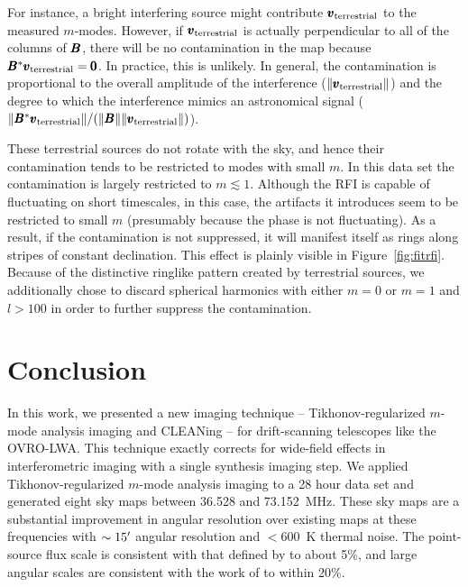\begin{bibunit}
For instance, a bright interfering source might contribute $\pmb v_\text{terrestrial}$ to the measured
$m$-modes. However, if $\pmb v_\text{terrestrial}$ is actually perpendicular to all of the columns of
$\pmb B$, there will be no contamination in the map because $\pmb B^*\pmb v_\text{terrestrial} = \pmb 0$.
In practice, this is unlikely. In general, the contamination is proportional to the overall amplitude
of the interference ($\|\pmb v_\text{terrestrial}\|$) and the degree to which the interference mimics
an astronomical signal ($\|\pmb B^*\pmb v_\text{terrestrial}\|/(\|\pmb B\|\|\pmb v_\text{terrestrial}\|)$).

These terrestrial sources do not rotate with the sky, and hence their contamination tends to be
restricted to modes with small $m$. In this data set the contamination is largely restricted to $m
\lesssim 1$. Although the RFI is capable of fluctuating on short timescales, in this case, the
artifacts it introduces seem to be restricted to small $m$ (presumably because the phase is not
fluctuating).  As a result, if the contamination is not suppressed, it will manifest itself as rings
along stripes of constant declination. This effect is plainly visible in Figure~\ref{fig:fitrfi}.
Because of the distinctive ringlike pattern created by terrestrial sources, we additionally chose to
discard spherical harmonics with either $m=0$ or $m=1$ and $l>100$ in order to further suppress the
contamination.

\section{Conclusion}\label{sec:conclusion}

In this work, we presented a new imaging technique -- Tikhonov-regularized $m$-mode analysis imaging
and CLEANing -- for drift-scanning telescopes like the OVRO-LWA.  This technique exactly corrects
for wide-field effects in interferometric imaging with a single synthesis imaging step.  We applied
Tikhonov-regularized $m$-mode analysis imaging to a 28 hour data set and generated eight sky maps
between 36.528 and 73.152~MHz.  These sky maps are a substantial improvement in angular resolution
over existing maps at these frequencies with $\sim15\mbox{$^\prime$}$ angular resolution and $<600$~K thermal
noise. The point-source flux scale is consistent with that defined by \citet{2012MNRAS.423L..30S} to
about 5\%, and large angular scales are consistent with the work of \citet{2017MNRAS.469.4537D} to
within 20\%.


\end{bibunit}
